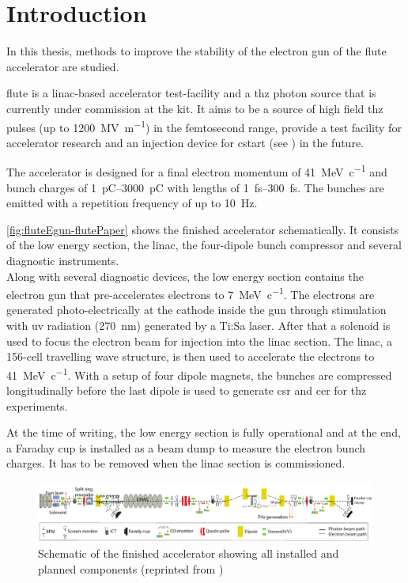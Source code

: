 \chapter{Introduction}\label{sec:intro}
In this thesis, methods to improve the stability of the electron gun of the \gls{flute} accelerator are studied.

\Gls{flute} is a \gls{linac}-based accelerator test-facility and a \gls{thz} photon source that is currently under commission at the \gls{kit}. It aims to be a source of high field \gls{thz} pulses (up to \SI{1200}{\mega\volt\per\meter}) in the femtosecond range, provide a test facility for accelerator research and an injection device for \gls{cstart} (see \cite{SchaeferHaererPapash2019_1000091183}) in the future. \cite{Naknaimueang:2011zz}

The accelerator is designed for a final electron momentum of \SI{41}{\MeV\per c} and bunch charges of \SIrange{1}{3000}{\pico\coulomb} with lengths of \SIrange{1}{300}{\fs}. The bunches are emitted with a repetition frequency of up to \SI{10}{\hertz}. \cite{Malygin2018}

\autoref{fig:fluteEgun-flutePaper} shows the finished accelerator schematically. It consists of the low energy section, the \gls{linac}, the four-dipole bunch compressor and several diagnostic instruments.\\
Along with several diagnostic devices, the low energy section contains the electron gun that pre-accelerates electrons to \SI{7}{\MeV\per c}. The electrons are generated photo-electrically at the cathode inside the gun through stimulation with \gls{uv} radiation (\SI{270}{\nm}) generated by a Ti:Sa laser. After that a solenoid is used to focus the electron beam for injection into the \gls{linac} section. The \gls{linac}, a 156-cell travelling wave structure, is then used to accelerate the electrons to \SI{41}{\MeV\per c}. With a setup of four dipole magnets, the bunches are compressed longitudinally before the last dipole is used to generate \gls{csr} and \gls{cer} for \gls{thz} experiments. \cite{Nasse:IPAC13-WEPWA010}

At the time of writing, the low energy section is fully operational and at the end, a Faraday cup is installed as a beam dump to measure the electron bunch charges. It has to be removed when the \gls{linac} section is commissioned.

\begin{figure}[tb]
	\centering
	\includegraphics[width=\textwidth]{chap/StabilityOfTheElectronGun/img/flutePaper.png}
	\caption[FLUTE schematic with all components]{Schematic of the finished accelerator showing all installed and planned components (reprinted from \cite{Yan2018})}
	\label{fig:fluteEgun-flutePaper}
\end{figure}


